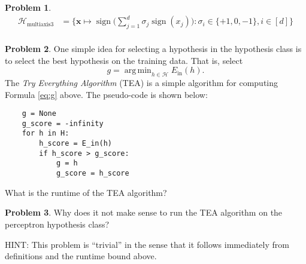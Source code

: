 \documentclass[10pt]{exam}
\theoremstyle{definition}
\newtheorem{problem}{Problem}
\DeclareMathOperator{\sign}{sign}
\DeclareMathOperator*{\argmin}{arg\,min}
\newcommand{\Ein}{E_{\text{in}}}
\newcommand{\x}{\mathbf x}
\newcommand{\lone}[1]{{\lVert {#1} \rVert}_1}
\newcommand{\ltwo}[1]{{\lVert {#1} \rVert}_2}
\newcommand{\lp}[1]{{\lVert {#1} \rVert}_p}
\newcommand{\HH}[1]{\mathcal H_{\text{#1}}}
\begin{document}
\begin{problem}
\begin{align*}
    \HH{multiaxis3} &= \bigg\{ \x \mapsto \sign\bigg(\sum_{j=1}^d \sigma_j \sign(x_j) \bigg): \sigma_i \in \{+1, 0, -1\}, i \in [d] \bigg\}  \\
\end{align*}
\end{problem}

\newpage
\begin{problem}
    One simple idea for selecting a hypothesis in the hypothesis class is to select the best hypothesis on the training data.
    That is, select
    \begin{equation}
        \label{eq:g}
        g = \argmin_{h\in\mathcal H} \Ein(h)
        .
    \end{equation}
    The \emph{Try Everything Algorithm} (TEA) is a simple algorithm for computing Formula \ref{eq:g} above.
    The pseudo-code is shown below:
    \begin{lstlisting}
    g = None
    g_score = -infinity
    for h in H:
        h_score = E_in(h)
        if h_score > g_score:
            g = h
            g_score = h_score
    \end{lstlisting}
    What is the runtime of the TEA algorithm?
\end{problem}

\vspace{3in}
\begin{problem}
    Why does it not make sense to run the TEA algorithm on the perceptron hypothesis class?

    HINT: This problem is ``trivial'' in the sense that it follows immediately from definitions and the runtime bound above.
\end{problem}

\newpage
\noindent
\end{document}
